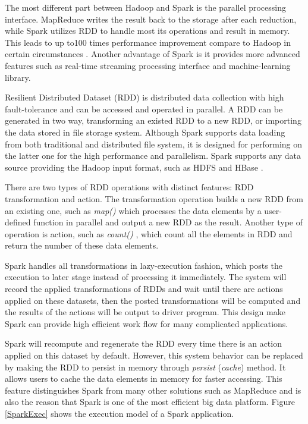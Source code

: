 The most different part between Hadoop and Spark is the parallel processing interface. MapReduce writes the result back to the storage after each reduction, while Spark utilizes RDD to handle most its operations and result in memory. This leads to up to100 times performance improvement compare to Hadoop in certain circumstances \cite{ApacheSpark}. Another advantage of Spark is it provides more advanced features such as real-time streaming processing interface and machine-learning library.

Resilient Distributed Dataset (RDD) is distributed data collection with high fault-tolerance and can be accessed and operated in parallel. A RDD can be generated in two way, transforming an existed RDD to a new RDD, or importing the data stored in file storage system. Although Spark supports data loading from both traditional and distributed file system, it is designed for performing on the latter one for the high performance and parallelism. Spark supports any data source providing the Hadoop input format, such as HDFS and HBase \cite{ApacheSpark}.

There are two types of RDD operations with distinct features: RDD transformation and action. The transformation operation builds a new RDD from an existing one, such as \emph{map()} which processes the data elements by a user-defined function in parallel and output a new RDD as the result. Another type of operation is action, such as \emph{count()} , which count all the elements in RDD and return the number of these data elements. 

Spark handles all transformations in lazy-execution fashion, which posts the execution to later stage instead of processing it immediately. The system will record the applied transformations of RDDs and wait until there are actions applied on these datasets, then the posted transformations will be computed and the results of the actions will be output to driver program. This design make Spark can provide high efficient work flow for many complicated applications. 

Spark will recompute and regenerate the RDD every time there is an action applied on this dataset by default. However, this system behavior can be replaced by making the RDD to persist in memory through \emph{persist} (\emph{cache}) method. It allows users to cache the data elements in memory for faster accessing. This feature distinguishes Spark from many other solutions such as MapReduce and is also the reason that Spark is one of the most efficient big data platform. Figure \ref{SparkExec} shows the execution model of a Spark application.

